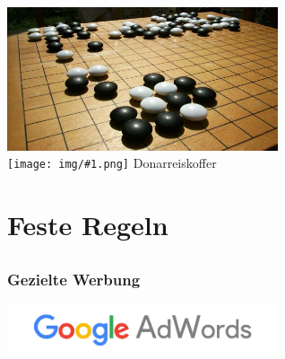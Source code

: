 \documentclass[12pt]{beamer}
\newcommand{\cc}[1]{\texttt{[image: img/\#1.png]}\hspace{1mm}}
\begin{document}
\begin{frame}
{\begin{center}
      \vspace{0.5cm}

      \includegraphics[width=0.6\textwidth]{img/go_board.jpg} \\
      \tiny \cc{by} Donarreiskoffer
    \end{center}
  }
\end{frame}

\section{Feste Regeln}
\subsection{}

\begin{frame}
  \frametitle{Gezielte Werbung}
  \begin{center}
    \includegraphics[width=0.6\textwidth]{img/adwords.png} \\
  \end{center}
\end{frame}
\end{document}
